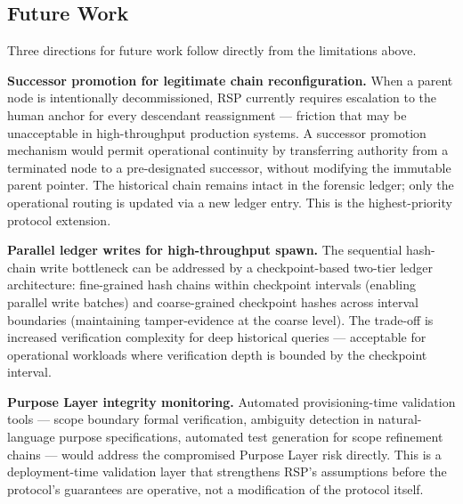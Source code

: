 \subsection{Future Work}
\label{sec:rs-future-work}

Three directions for future work follow directly from the limitations above.

\medskip
\noindent\textbf{Successor promotion for legitimate chain reconfiguration.} When a parent node is intentionally decommissioned, RSP currently requires escalation to the human anchor for every descendant reassignment — friction that may be unacceptable in high-throughput production systems. A successor promotion mechanism would permit operational continuity by transferring authority from a terminated node to a pre-designated successor, without modifying the immutable parent pointer. The historical chain remains intact in the forensic ledger; only the operational routing is updated via a new ledger entry. This is the highest-priority protocol extension.

\medskip
\noindent\textbf{Parallel ledger writes for high-throughput spawn.} The sequential hash-chain write bottleneck can be addressed by a checkpoint-based two-tier ledger architecture: fine-grained hash chains within checkpoint intervals (enabling parallel write batches) and coarse-grained checkpoint hashes across interval boundaries (maintaining tamper-evidence at the coarse level). The trade-off is increased verification complexity for deep historical queries — acceptable for operational workloads where verification depth is bounded by the checkpoint interval.

\medskip
\noindent\textbf{Purpose Layer integrity monitoring.} Automated provisioning-time validation tools — scope boundary formal verification, ambiguity detection in natural-language purpose specifications, automated test generation for scope refinement chains — would address the compromised Purpose Layer risk directly. This is a deployment-time validation layer that strengthens RSP's assumptions before the protocol's guarantees are operative, not a modification of the protocol itself.
